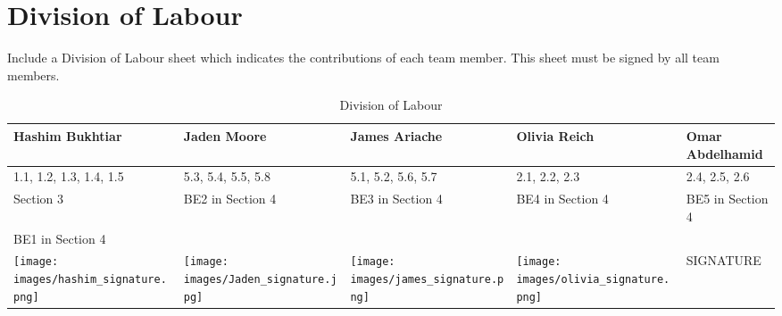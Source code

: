 \documentclass[]{article}
\begin{document}

\appendix
\section{Division of Labour}
\label{sec:division_of_labour}
Include a Division of Labour sheet which indicates the contributions of each team member. This sheet must be signed by all team members.

\begin{table}[h!]
\centering
\begin{tabular}{|p{3cm}|p{3cm}|p{3cm}|p{3cm}|p{3cm}|}
\hline
Hashim Bukhtiar & Jaden Moore & James Ariache & Olivia Reich & Omar Abdelhamid \\ \hline
1.1, 1.2, 1.3, 1.4, 1.5 & 5.3, 5.4, 5.5, 5.8 & 5.1, 5.2, 5.6, 5.7 & 2.1, 2.2, 2.3 & 2.4, 2.5, 2.6 \\ 
Section 3 & BE2 in Section 4 & BE3 in Section 4 & BE4 in Section 4 & BE5 in Section 4 \\ 
BE1 in Section 4 & & & & \\ \hline
\texttt{[image: images/hashim\_signature.png]} & \texttt{[image: images/Jaden\_signature.jpg]} &
\texttt{[image: images/james\_signature.png]}& \texttt{[image: images/olivia\_signature.png]} & SIGNATURE \\ \hline
\end{tabular}
\caption{Division of Labour}
\label{tab:division_of_labour}
\end{table}


\end{document}
